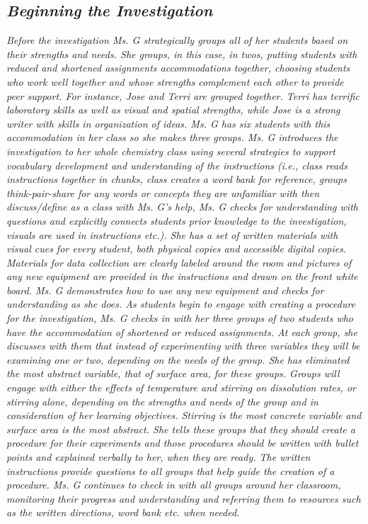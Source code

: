 \documentclass[11pt]{sig-alternate}
\begin{document}
\begin{large}
\subsection*{\textit{\textbf{Beginning the Investigation}}}
\textit{Before the investigation Ms. G strategically groups all of her students based on their strengths and needs. She groups, in this case, in twos, putting students with reduced and shortened assignments accommodations together, choosing students who work well together and whose strengths complement each other to provide peer support. For instance, Jose and Terri are grouped together. Terri has terrific laboratory skills as well as visual and spatial strengths, while Jose is a strong writer with skills in organization of ideas. Ms. G has six students with this accommodation in her class so she makes three groups. Ms. G introduces the investigation to her whole chemistry class using several strategies to support vocabulary development and understanding of the instructions (i.e., class reads instructions together in chunks, class creates a word bank for reference, groups think-pair-share for any words or concepts they are unfamiliar with then discuss/define as a class with Ms. G’s help, Ms. G checks for understanding with questions and explicitly connects students prior knowledge to the investigation, visuals are used in instructions etc.). She has a set of written materials with visual cues for every student, both physical copies and accessible digital copies. Materials for data collection are clearly labeled around the room and pictures of any new equipment are provided in the instructions and drawn on the front white board. Ms. G demonstrates how to use any new equipment and checks for understanding as she does. As students begin to engage with creating a procedure for the investigation, Ms. G checks in with her three groups of two students who have the accommodation of shortened or reduced assignments. At each group, she discusses with them that instead of experimenting with three variables they will be examining one or two, depending on the needs of the group. She has eliminated the most abstract variable, that of surface area, for these groups. Groups will engage with either the effects of temperature and stirring on dissolution rates, or stirring alone, depending on the strengths and needs of the group and in consideration of her learning objectives. Stirring is the most concrete variable and surface area is the most abstract. She tells these groups that they should create a procedure for their experiments and those procedures should be written with bullet points and explained verbally to her, when they are ready. The written instructions provide questions to all groups that help guide the creation of a procedure. Ms. G continues to check in with all groups around her classroom, monitoring their progress and understanding and referring them to resources such as the written directions, word bank etc. when needed.}


\end{large}
\end{document}
